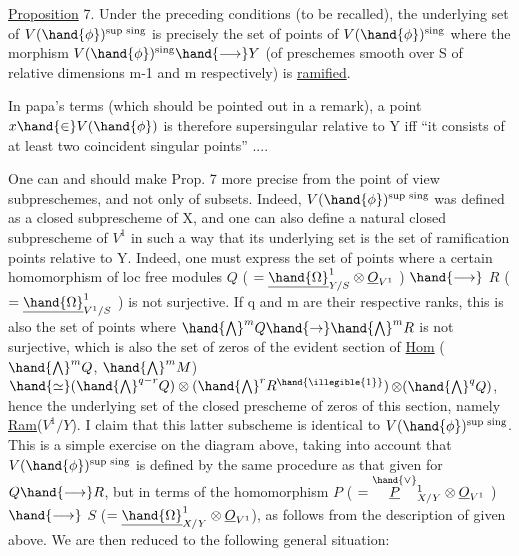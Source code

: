 
\uline{Proposition} 7. Under the preceding conditions (to be recalled), the underlying
set of $V(\hand{\phi})^{\text{sup sing}}$ is precisely the set of points of
$V(\hand{\phi})^{\text{sing}}$  where the morphism $V(\hand{\phi})^{\text{sing}}\hand{\longrightarrow} Y$ (of preschemes smooth
over S of relative dimensions m-1 and m respectively) is \uline{ramified}.

In papa's terms (which should be pointed out in a remark), a point
$x \hand{\in} V(\hand{\phi})$ is therefore supersingular relative to Y iff ``it consists of at
least two coincident singular points'' ....

One can and should make Prop. 7 more precise from the point of view   subpreschemes,
and not only of subsets. Indeed, $V(\hand{\phi})^{\text{sup sing}}$ was
defined as a closed subprescheme of X, and one can also define
a natural closed subprescheme of $V^1$ in such a way that its underlying
set is the set of ramification points relative to Y.
Indeed, one must express the set of points where a certain homomorphism
of loc free modules $Q$ ( $=\underline{\hand{\Omega}}^1_{Y/S}\otimes\underline{O}_{V^1}$ ) $\hand{\longrightarrow}$ $R$ ( $=\underline{\hand{\Omega}}^1_{V^1/S}$ )
is not surjective. If q and m are their respective ranks, this is also
the set of points where $\hand{\bigwedge}^{m} Q \hand{\rightarrow} \hand{\bigwedge}^{m} R$ is not surjective, which is
also the set of zeros of the evident section of \uline{Hom} ( $\hand{\bigwedge}^{m} Q$, $\hand{\bigwedge}^{m} M$)
$\hand{\simeq} (\hand{\bigwedge}^{q-r} Q)\otimes(\hand{\bigwedge}^{r} R^{\hand{\illegible{1}}})$$\otimes(\hand{\bigwedge}^{q} Q)$\hand{$^{\vee}$}, hence the underlying set of the closed prescheme
of zeros of this section, namely \uline{Ram}($V^1/Y$). I claim that this latter
subscheme is identical to $V(\hand{\phi})^{\text{sup sing}}$. This is a simple exercise
on the diagram above, taking into account that $V(\hand{\phi})^{\text{sup sing}}$ is defined
by the same procedure as that given for $Q\hand{\longrightarrow} R$, but in terms of
the homomorphism $P$ ( $= \overset{\hand{\vee}}{\underline{P}}{}^1_{X/Y}\otimes\underline{O}_{V^1}$ ) $\hand{\longrightarrow}$ $S$ ($=\underline{\hand{\Omega}}^1_{X/Y}\otimes\underline{O}_{V^1}$), as
follows from the description of \hand{$\mu$} given above. We are then
reduced to the following general situation:

